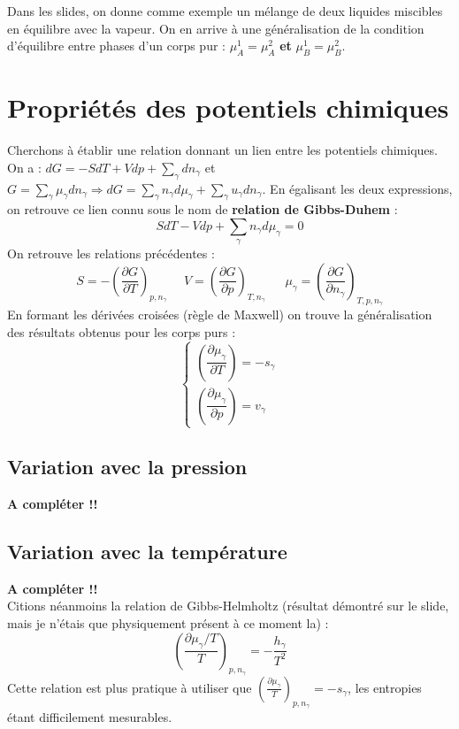 \documentclass[11pt, a4paper, openany]{book}
\begin{document}
Dans les slides, on donne comme exemple un mélange de deux liquides miscibles en équilibre avec la vapeur. On en arrive à une généralisation de la condition d'équilibre entre phases d'un corps pur : $\mu_A^1 = \mu_A^2$ \textbf{et} $\mu_B^1 = \mu_B^2$.

\section{Propriétés des potentiels chimiques}
Cherchons à établir une relation donnant un lien entre les potentiels chimiques. On a : $dG = -S dT + V dp + \sum_\gamma dn_\gamma$ et $G = \sum_\gamma \mu_\gamma dn_\gamma \Rightarrow dG = \sum_\gamma n_\gamma d\mu_\gamma + \sum_\gamma u_\gamma dn_\gamma$. En égalisant les deux expressions, on retrouve ce lien connu sous le nom de \textbf{relation de Gibbs-Duhem} :
\begin{equation}
SdT - Vdp + \sum_\gamma n_\gamma d\mu_\gamma = 0
\end{equation}
On retrouve les relations précédentes :
\begin{equation}
S = - \left(\frac{\partial G}{\partial T}\right)_{p, n_\gamma}\ \ \ \ \ \  V =  \left(\frac{\partial G}{\partial p}\right)_{T, n_\gamma}\ \ \ \ \ \ \ \mu_\gamma = \left(\frac{\partial G}{\partial n_\gamma}\right)_{T, p, n_\gamma}
\end{equation}
En formant les dérivées croisées (règle de Maxwell) on trouve la généralisation des résultats obtenus pour les corps purs :
\begin{equation}
\left\{\begin{array}{l}
\left( \dfrac{\partial \mu_\gamma}{\partial T} \right) = -s_\gamma\\
\left( \dfrac{\partial \mu_\gamma}{\partial p} \right) = v_\gamma
\end{array}\right.
\end{equation}
\subsection{Variation avec la pression}
\textbf{A compléter !!}

\subsection{Variation avec la température}
\textbf{A compléter !!}\\
Citions néanmoins la relation de Gibbs-Helmholtz (résultat démontré sur le slide, mais je n'étais que physiquement présent à ce moment la) :
\begin{equation}
\left(\frac{\partial \mu_\gamma/T}{T}\right)_{p, n_\gamma} = -\frac{h_\gamma}{T^2}
\end{equation}
Cette relation est plus pratique à utiliser que $\left(\frac{\partial \mu_\gamma}{T}\right)_{p, n_\gamma} = -s_\gamma$, les entropies étant difficilement mesurables.
\end{document}
